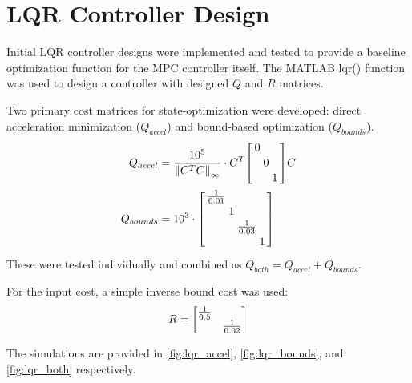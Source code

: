 \documentclass[onecolumn]{IEEEtran}
\begin{document}
\section{LQR Controller Design}
Initial LQR controller designs were implemented and tested to provide a baseline optimization function for the MPC controller itself.
The MATLAB lqr() function was used to design a controller with designed $Q$ and $R$ matrices.

Two primary cost matrices for state-optimization were developed: direct acceleration minimization ($Q_{accel}$) and bound-based optimization ($Q_{bounds}$).
\begin{align}
    Q_{accel} &= \frac{10^5}{\norm{C^T C}_\infty} \cdot C^T \smqty[\dmat{0,0,1}] C
    \\
    Q_{bounds} &= 10^3 \cdot \smqty[\dmat{\frac{1}{0.01},1,\frac{1}{0.03},1}]
\end{align}
These were tested individually and combined as $Q_{both} = Q_{accel} + Q_{bounds}$.

For the input cost, a simple inverse bound cost was used:
\begin{gather}
    R = \mqty[\dmat{\frac{1}{0.5}, \frac{1}{0.02}}]
\end{gather}

The simulations are provided in \autoref{fig:lqr_accel}, \autoref{fig:lqr_bounds}, and \autoref{fig:lqr_both} respectively.
\end{document}

